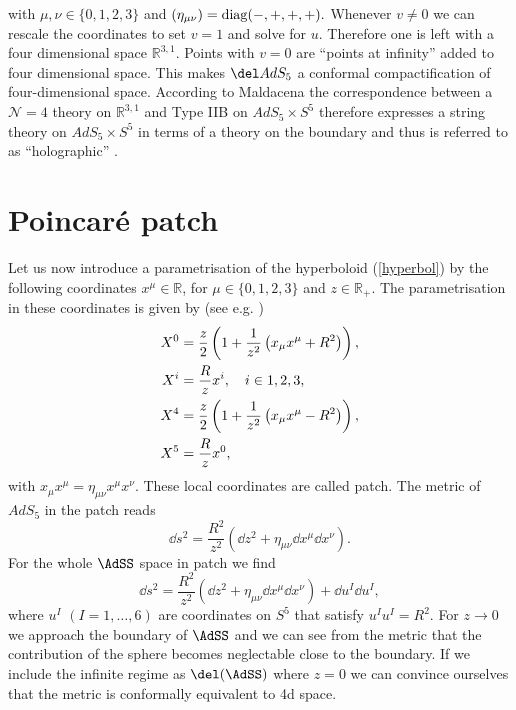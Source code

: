 with $\mu,\nu \in \lbrace 0,1,2,3\rbrace$ and $\left(\eta_{\mu \nu}\right) = {\rm diag}(-,+,+,+).$ Whenever $v \neq 0$ we can rescale the coordinates to set $v = 1$ and solve for $u$. Therefore one is left with a four dimensional  space $\mathbb{R}^{3,1}$. Points with $v=0$ are ``points at infinity'' added to four dimensional  space. This makes $\del AdS_{5}$ a conformal compactification of four-dimensional  space. According to Maldacena \cite{maldacena1} the correspondence between a $\mathcal{N}=4$ theory on $\mathbb{R}^{3,1}$ and Type IIB on $AdS_{5}\times S^{5}$ therefore expresses a string theory on $AdS_{5}\times S^{5}$ in terms of a theory on the boundary and thus is referred to as ``holographic'' \cite{Witten:1998qj}.
%
%
\section{Poincaré patch}\label{p_patch}
Let us now introduce a parametrisation of the hyperboloid (\ref{hyperbol}) by the following coordinates $x^{\mu} \in \mathbb{R}$, for $\mu \in \lbrace 0,1,2,3\rbrace$ and $z \in \mathbb{R}_{+}$. The parametrisation in these coordinates is given by (see e.g. \cite{Ammon:2015wua,Bayona:2005nq})
\begin{align}
X^{0} &= \frac{z}{2} \left( 1+ \frac{1}{z^{2}}\left( x_{\mu}x^{\mu} + R^{2}\right) \right), \notag \\
X^{i} &= \frac{R}{z}x^{i},\quad i\in {1,2,3}, \\
X^{4} &= \frac{z}{2} \left( 1 + \frac{1}{z^{2}} \left(x_{\mu}x^{\mu} -R^{2} \right) \right), \notag \\
X^{5} &= \frac{R}{z}x^{0}, \notag
\end{align}
with $x_{\mu}x^{\mu}=\eta_{\mu\nu}x^{\mu}x^{\nu}$. These local coordinates are called  patch. The metric of $AdS_{5}$ in the  patch reads
\begin{equation}
\dd s^{2} = \frac{R^{2}}{z^{2}}\left(\dd z^{2} + \eta_{\mu \nu} \dd x^{\mu} \dd x^{\nu} \right).
\end{equation}
%
%
For the whole $\AdSS$ space in  patch we find
%
%
\begin{equation}
\dd s^{2} = \frac{R^{2}}{z^{2}}\left(\dd z^{2} + \eta_{\mu \nu} \dd x^{\mu} \dd x^{\nu} \right) + \dd u^{I}\dd u^{I},
\end{equation}
%
%
where $u^{I}$ $(I=1,\ldots,6)$ are coordinates on $S^{5}$ that satisfy $u^{I}u^{I}=R^{2}$. For $z\to 0$ we approach the boundary of $\AdSS$ and we can see from the metric that the contribution of the sphere becomes neglectable close to the boundary. If we include the infinite regime as $\del (\AdSS)$ where $z=0$ we can convince ourselves that the metric is conformally equivalent to 4d  space.
%
%
%
%
%
%
